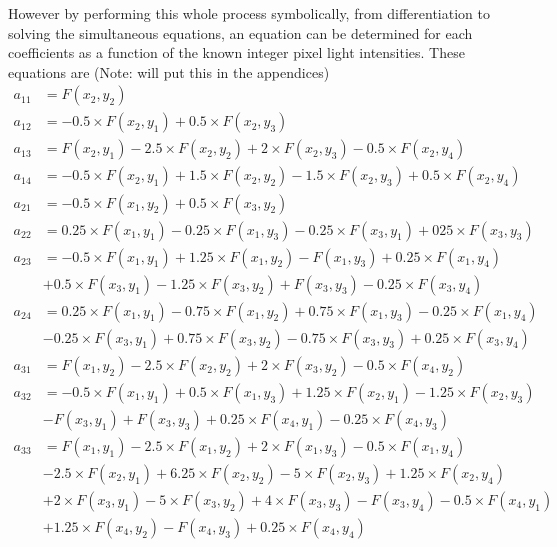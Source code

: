 \documentclass[12pt,oneside,openany,a4paper, %
english, %
masters-t, goldenblock]{usthesis}
\begin{document}
However by performing this whole process symbolically, from differentiation to solving the simultaneous equations, an equation can be determined for each coefficients as a function of the known integer pixel light intensities. These equations are (Note: will put this in the appendices)
\begin{align}
  a_{11} &= F(x_2,y_2) \\
  a_{12} &= -0.5 \times F(x_2,y_1) + 0.5 \times F(x_2,y_3) \\
  a_{13} &= F(x_2,y_1) - 2.5 \times F(x_2,y_2) + 2 \times F(x_2,y_3) - 0.5 \times F(x_2,y_4) \\
  a_{14} &= -0.5 \times F(x_2,y_1) + 1.5 \times F(x_2,y_2) - 1.5 \times F(x_2,y_3) + 0.5 \times F(x_2,y_4) \\
  a_{21} &= -0.5 \times F(x_1,y_2) + 0.5 \times F(x_3,y_2) \\
  a_{22} &= 0.25 \times F(x_1,y_1) - 0.25 \times F(x_1,y_3) - 0.25 \times F(x_3,y_1) + 025 \times F(x_3,y_3) \\
  a_{23} &= -0.5 \times F(x_1,y_1) + 1.25 \times F(x_1,y_2) - F(x_1,y_3) + 0.25 \times F(x_1,y_4) \nonumber \\ &+ 0.5 \times F(x_3,y_1) - 1.25 \times F(x_3,y_2) + F(x_3,y_3) - 0.25 \times F(x_3,y_4) \\
  a_{24} &= 0.25 \times F(x_1,y_1) - 0.75 \times F(x_1,y_2) + 0.75 \times F(x_1,y_3) - 0.25 \times F(x_1,y_4) \nonumber \\ &- 0.25 \times F(x_3,y_1) + 0.75 \times F(x_3,y_2) - 0.75 \times F(x_3,y_3) + 0.25 \times F(x_3,y_4) \\
  a_{31} &= F(x_1,y_2) - 2.5 \times F(x_2,y_2) + 2 \times F(x_3,y_2) - 0.5 \times F(x_4,y_2) \\
  a_{32} &= -0.5 \times F(x_1,y_1) + 0.5 \times F(x_1,y_3) + 1.25 \times F(x_2,y_1) - 1.25 \times F(x_2,y_3) \nonumber \\ &- F(x_3,y_1) + F(x_3,y_3) + 0.25 \times F(x_4,y_1) - 0.25 \times F(x_4,y_3) \\
  a_{33} &= F(x_1,y_1) - 2.5 \times F(x_1,y_2) + 2 \times F(x_1,y_3) - 0.5 \times F(x_1,y_4) \nonumber \\ &- 2.5 \times F(x_2,y_1) + 6.25 \times F(x_2,y_2) - 5 \times F(x_2,y_3) + 1.25 \times F(x_2,y_4) \nonumber \\ &+ 2 \times F(x_3,y_1) - 5 \times F(x_3,y_2) + 4 \times F(x_3,y_3) - F(x_3,y_4) - 0.5 \times F(x_4,y_1) \nonumber \\ &+ 1.25 \times F(x_4,y_2) - F(x_4,y_3) + 0.25 \times F(x_4,y_4) \\

\end{align}
\end{document}
